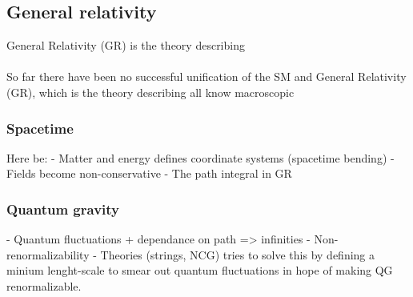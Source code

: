 \subsection{General relativity}
General Relativity (GR) is the theory describing
\\ \\
So far there have been no successful unification of the SM and General Relativity (GR), which is the theory describing all know macroscopic

\subsubsection{Spacetime}
Here be:
- Matter and energy defines coordinate systems (spacetime bending)
- Fields become non-conservative
- The path integral in GR

\subsubsection{Quantum gravity}
- Quantum fluctuations + dependance on path => infinities
- Non-renormalizability
- Theories (strings, NCG) tries to solve this by defining a minium lenght-scale
  to smear out quantum fluctuations in hope of making QG renormalizable.